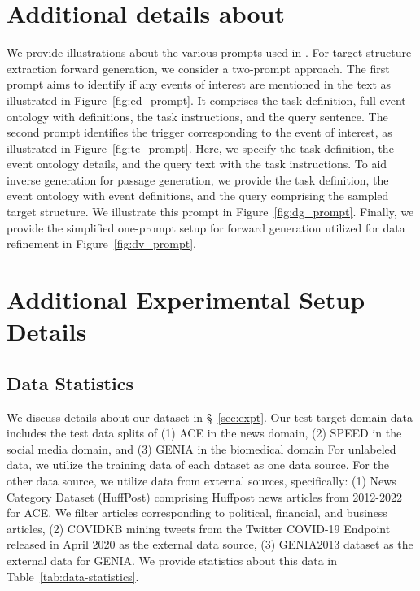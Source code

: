 \appendix

\section{Additional details about \modelName}
\label{sec:appendix-exgen-prompts}

We provide illustrations about the various prompts used in \modelName{}.
For target structure extraction forward generation, we consider a two-prompt approach.
The first prompt aims to identify if any events of interest are mentioned in the text as illustrated in Figure~\ref{fig:ed_prompt}.
It comprises the task definition, full event ontology with definitions, the task instructions, and the query sentence.
The second prompt identifies the trigger corresponding to the event of interest, as illustrated in Figure~\ref{fig:te_prompt}.
Here, we specify the task definition, the event ontology details, and the query text with the task instructions.
To aid inverse generation for passage generation, we provide the task definition, the event ontology with event definitions, and the query comprising the sampled target structure.
We illustrate this prompt in Figure~\ref{fig:dg_prompt}.
Finally, we provide the simplified one-prompt setup for forward generation utilized for data refinement in Figure~\ref{fig:dv_prompt}.

\section{Additional Experimental Setup Details}

\subsection{Data Statistics}
We discuss details about our dataset in \S~\ref{sec:expt}.
Our test target domain data includes the test data splits of (1) ACE \cite{doddington-etal-2004-automatic} in the news domain,
(2) SPEED \cite{parekh-etal-2024-event} in the social media domain, and
(3) GENIA \cite{kim-etal-2011-overview-genia} in the biomedical domain
For unlabeled data, we utilize the training data of each dataset as one data source.
For the other data source, we utilize data from external sources, specifically:
(1) News Category Dataset (HuffPost) \cite{huffpost-data} comprising Huffpost news articles from 2012-2022 for ACE. We filter articles corresponding to political, financial, and business articles,
(2) COVIDKB \cite{zong-etal-2022-extracting} mining tweets from the Twitter COVID-19 Endpoint released in April 2020 as the external data source,
(3) GENIA2013 dataset \cite{kim-etal-2013-genia} as the external data for GENIA.
We provide statistics about this data in Table~\ref{tab:data-statistics}.

